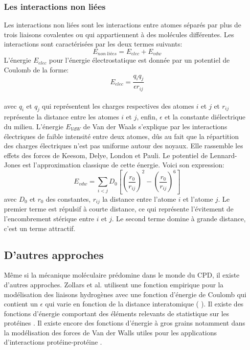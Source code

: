 \subsubsection{Les interactions non liées}
Les interactions non liées sont les interactions entre atomes séparés par plus de trois liaisons covalentes ou qui appartiennent à des molécules différentes. Les interactions sont caractérisées par les deux termes suivants:
\begin{equation}
E_{non\ liées} = E_{elec} + E_{vdw}  
\end{equation}
L'énergie $E_{elec}$ pour l'énergie électrostatique est donnée par un potentiel de Coulomb de la forme:
\begin{equation}
  E_{elec}=\frac{q_iq_j}{\epsilon r_{ij}}
\end{equation}\\
avec $q_i$ et $q_j$ qui représentent les charges respectives des atomes $i$ et $j$ et $r_{ij}$ représente la distance entre les atomes $i$ et $j$, enfin, $\epsilon$ et la constante diélectrique du milieu.
L'énergie  $E_{VdW}$ de Van der Waals s'explique par les interactions électriques de faible intensité entre deux atomes, dûs au fait que la répartition des charges électriques n'est pas uniforme autour des noyaux. Elle rassemble les effets des forces de Keesom, Delye, London et Pauli. Le potentiel de Lennard-Jones est l'approximation classique de cette énergie. Voici son expression:
\begin{equation}
    \label{VdW}
E_{vdw} = \sum_{i<j}D_0 [(\frac{r_0}{r_{ij}})^2 - (\frac{r_0}{r_{ij}})^6]  
\end{equation}
avec $D_0$ et $r_0$ des constantes, $r_{ij}$ la distance entre l'atome $i$ et l'atome $j$. Le premier terme est répulsif à courte distance, ce qui représente l'évitement de l'encombrement stérique entre $i$ et $j$. Le second terme domine à grande distance, c'est un terme attractif. 
  

\subsection{D'autres approches}

Même si la mécanique moléculaire prédomine dans le monde du CPD, il existe d'autres approches. Zollars et al. utilisent une fonction empirique pour la modélisation des liaisons hydrogènes avec une fonction d'énergie de Coulomb qui contient un $\epsilon$ qui varie en fonction de la distance interatomique ( \cite{Zollars06}). Il existe des fonctions d'énergie comportant des éléments relevants de statistique sur les protéines \cite{Pokala05}. Il existe encore des fonctions d'énergie à gros grains notamment dans la modélisation des forces de Van der Walls utiles pour les applications d'interactions protéine-protéine \cite{Korkut09}.

